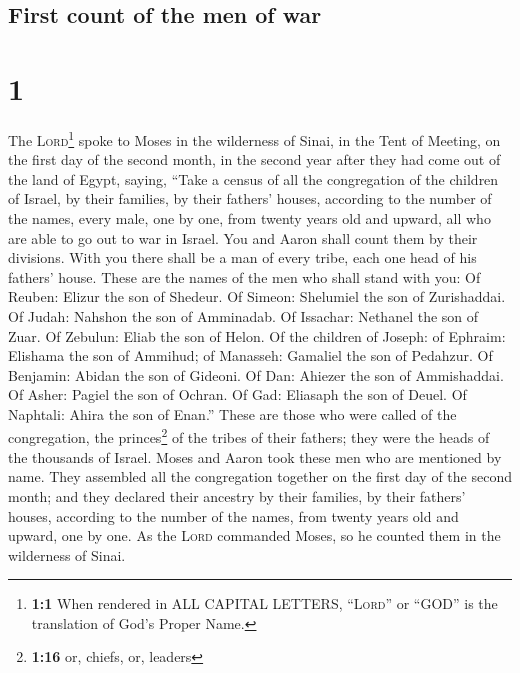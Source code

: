\hypertarget{first-count-of-the-men-of-war}{%
\subsection{First count of the men of
war}\label{first-count-of-the-men-of-war}}

\hypertarget{section}{%
\section{1}\label{section}}

 The \textsc{Lord}\footnote{\textbf{1:1} When rendered in
  ALL CAPITAL LETTERS, ``\textsc{Lord}'' or ``GOD'' is the translation
  of God's Proper Name.} spoke to Moses in the wilderness of Sinai, in
the Tent of Meeting, on the first day of the second month, in the second
year after they had come out of the land of Egypt, saying,
 ``Take a census of all the congregation of the children
of Israel, by their families, by their fathers' houses, according to the
number of the names, every male, one by one,  from twenty
years old and upward, all who are able to go out to war in Israel. You
and Aaron shall count them by their divisions.  With you
there shall be a man of every tribe, each one head of his fathers'
house.  These are the names of the men who shall stand
with you: Of Reuben: Elizur the son of Shedeur.  Of
Simeon: Shelumiel the son of Zurishaddai.  Of Judah:
Nahshon the son of Amminadab.  Of Issachar: Nethanel the
son of Zuar.  Of Zebulun: Eliab the son of Helon.
 Of the children of Joseph: of Ephraim: Elishama the son
of Ammihud; of Manasseh: Gamaliel the son of Pedahzur. 
Of Benjamin: Abidan the son of Gideoni.  Of Dan: Ahiezer
the son of Ammishaddai.  Of Asher: Pagiel the son of
Ochran.  Of Gad: Eliasaph the son of Deuel.
 Of Naphtali: Ahira the son of Enan.'' 
These are those who were called of the congregation, the
princes\footnote{\textbf{1:16} or, chiefs, or, leaders} of the tribes of
their fathers; they were the heads of the thousands of Israel.
 Moses and Aaron took these men who are mentioned by
name.  They assembled all the congregation together on
the first day of the second month; and they declared their ancestry by
their families, by their fathers' houses, according to the number of the
names, from twenty years old and upward, one by one.  As
the \textsc{Lord} commanded Moses, so he counted them in the wilderness
of Sinai.

